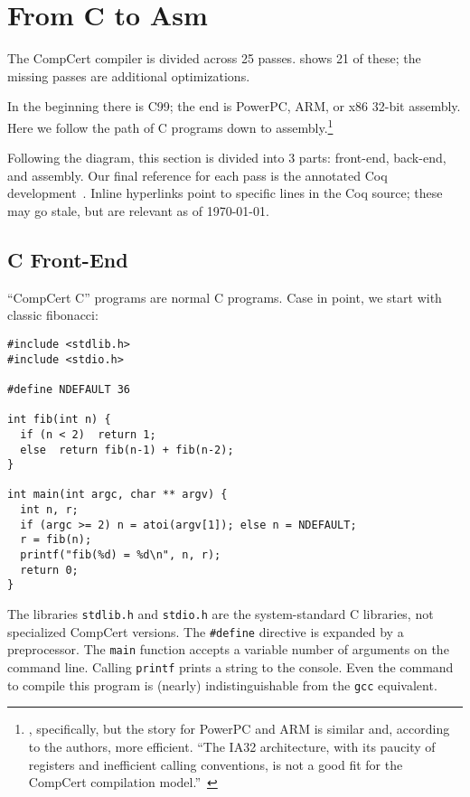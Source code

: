 \section{From C to Asm}
\label{sec:passes}

The CompCert compiler is divided across 25 passes.
 shows 21 of these; the missing passes are additional optimizations.

In the beginning there is C99; the end is PowerPC, ARM, or x86 32-bit assembly.
Here we follow the path of C programs down to assembly.\footnote{\intel, specifically, but the story for PowerPC and ARM is similar and, according to the authors, more efficient. ``The IA32 architecture, with its paucity of registers and inefficient calling conventions, is not a good fit for the CompCert compilation model.''~\cite{refman}}

Following the diagram, this section is divided into 3 parts: front-end, back-end, and assembly.
Our final reference for each pass is the annotated Coq development~\cite{src}.
Inline hyperlinks point to specific lines in the Coq source; these may go stale, but are relevant as of \today.


\subsection{C Front-End}

``CompCert C'' programs are normal C programs.
Case in point, we start with classic fibonacci:
\begin{lstlisting}
#include <stdlib.h>
#include <stdio.h>

#define NDEFAULT 36

int fib(int n) {
  if (n < 2)  return 1;
  else  return fib(n-1) + fib(n-2);
}

int main(int argc, char ** argv) {
  int n, r;
  if (argc >= 2) n = atoi(argv[1]); else n = NDEFAULT;
  r = fib(n);
  printf("fib(%d) = %d\n", n, r);
  return 0;
}
\end{lstlisting}
The libraries \lstinline{stdlib.h} and \lstinline{stdio.h} are the system-standard C libraries, not specialized CompCert versions.
The \lstinline{#define} directive is expanded by a preprocessor.
The \lstinline{main} function accepts a variable number of arguments on the command line.
Calling \lstinline{printf} prints a string to the console.
Even the command to compile this program is (nearly) indistinguishable from the {\tt gcc} equivalent.

